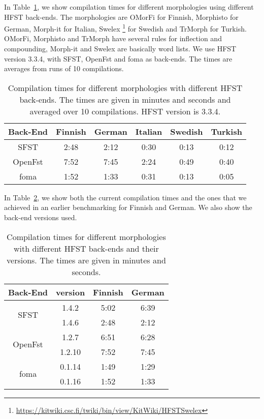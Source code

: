 \documentclass[draft]{llncs}
\begin{document}
In Table~\ref{tab:compilation_times}, we show compilation times for different 
morphologies using different HFST back-ends. The morphologies are OMorFi 
\cite{pirinen/2008} for Finnish, Morphisto \cite{zielinski/2009} for German,
Morph-it \cite{Zanchetta/2005} for Italian, Swelex 
\footnote{\url{https://kitwiki.csc.fi/twiki/bin/view/KitWiki/HFSTSwelex}} 
for Swedish and TrMorph \cite{Coltekin/2010} for Turkish. 
OMorFi, Morphisto and TrMorph have several rules for
inflection and compounding, Morph-it and Swelex are basically word lists.
We use HFST version 3.3.4, with SFST, OpenFst and foma as
back-ends. The times are averages from runs of 10 compilations.

\begin{table} [h!]
  \centering
  \caption{Compilation times for different morphologies with
    different HFST back-ends. The times are given in minutes and seconds
    and averaged over 10 compilations. HFST version is 3.3.4.}
  \begin{tabular}{c c c c c c }
    \hline
    Back-End & Finnish & German & Italian & Swedish & Turkish \\ \hline
    SFST & 2:48 & 2:12 & 0:30 & 0:13 & 0:12 \\
    OpenFst & 7:52 & 7:45 & 2:24 & 0:49 & 0:40 \\
    foma & 1:52 & 1:33 & 0:31 & 0:13 & 0:05 \\ \hline
  \end{tabular}
  \label{tab:compilation_times}
\end{table}


In Table~\ref{tab:compilation_times_versions}, we show both the current compilation 
times and the ones that we achieved in an earlier benchmarking \cite{linden/2011/sfcm} for 
Finnish and German. We also show the back-end versions used.

\begin{table} [h!]
  \centering
  \caption{Compilation times for different morphologies with
    different HFST back-ends and their versions. 
    The times are given in minutes and seconds.}
  \begin{tabular}{ c c c c }
    \hline
    Back-End                 & version  & Finnish  & German \\ \hline
    \multirow{2}{*}{SFST}    & 1.4.2    & 5:02     & 6:39 \\
    & 1.4.6    & 2:48     & 2:12 \\
    \multirow{2}{*}{OpenFst} & 1.2.7    & 6:51     & 6:28 \\
    & 1.2.10   & 7:52     & 7:45 \\
    \multirow{2}{*}{foma}    & 0.1.14   & 1:49     & 1:29 \\
    & 0.1.16   & 1:52     & 1:33 \\
    \hline
  \end{tabular}
  \label{tab:compilation_times_versions}
\end{table}
\end{document}

